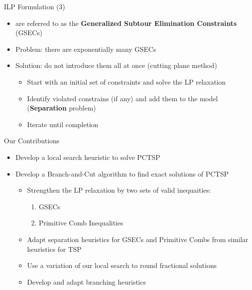 \begin{frame}[t]{ILP Formulation (3)}
    \begin{itemize}
        \item<1->  are referred to as the \textbf{Generalized Subtour Elimination Constraints} (GSECs) 
        \item<2-> Problem: there are exponentially many GSECs
        \item<3-> Solution: do not introduce them all at once (cutting plane method)
            \begin{itemize}
                \item<4-> Start with an initial set of constraints and solve the LP relaxation
                \item<5-> Identify violated constrains (if any) and add them to the model (\textbf{Separation} problem)
                \item<6-> Iterate until completion
            \end{itemize}    
    \end{itemize}
\end{frame}

\begin{frame}[t]{Our Contributions}
    \begin{itemize}
        \item<1-> Develop a \alert{local search} heuristic to solve PCTSP
        \item<2-> Develop a \alert{Branch-and-Cut} algorithm to find exact solutions of PCTSP
            \begin{itemize}
                \item<3-> Strengthen the LP relaxation by two sets of valid inequaities:
                    \begin{enumerate}
                        \item<4-> GSECs
                        \item<5-> Primitive Comb Inequalities
                    \end{enumerate}
                \item<6-> Adapt \alert{separation heuristics} for GSECs and Primitive Combs from similar heuristics for TSP
                \item<7-> Use a variation of our local search to \alert{round} fractional solutions
                \item<8-> Develop and adapt \alert{branching heuristics}
            \end{itemize}
    \end{itemize}
\end{frame}

